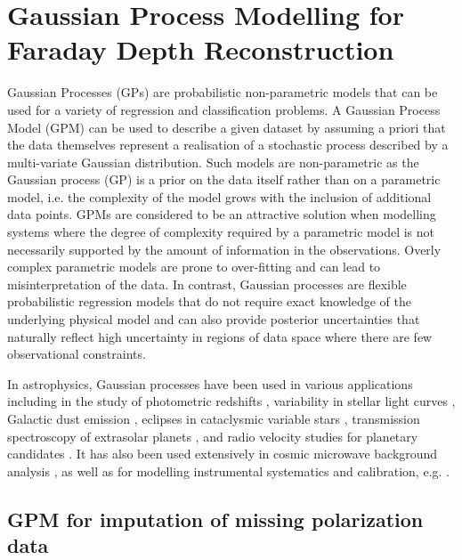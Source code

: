\documentclass[fleqn,usenatbib]{mnras}
\begin{document}
\section{Gaussian Process Modelling for Faraday Depth Reconstruction}
\label{sec:astrogpm}

Gaussian Processes (GPs) are probabilistic non-parametric models that can be used for a variety of regression and classification problems. A Gaussian Process Model (GPM) can be used to describe a given dataset by assuming a priori that the data themselves represent a realisation of a stochastic process described by a multi-variate Gaussian distribution. Such models are non-parametric as the Gaussian process (GP) is a prior on the data itself rather than on a parametric model, i.e. the complexity of the model grows with the inclusion of additional data points. GPMs are considered to be an attractive solution when modelling systems where the degree of complexity required by a parametric model is not necessarily supported by the amount of information in the observations. Overly complex parametric models are prone to over-fitting and can lead to misinterpretation of the data. In contrast, Gaussian processes are flexible probabilistic regression models that do not require exact knowledge of the underlying physical model and can also provide posterior uncertainties that naturally reflect high uncertainty in regions of data space where there are few observational constraints.

In astrophysics, Gaussian processes have been used in various applications including in the study of photometric redshifts \citep{wa06300n}, variability in stellar light curves \citep{2018MNRAS.474.2094A}, Galactic dust emission \citep{ensslinfromert}, eclipses in cataclysmic variable stars \citep{10.1093/mnras/stw2417}, transmission spectroscopy of extrasolar planets \citep{2012MNRAS.419.2683G}, and radio velocity studies for planetary candidates \citep{10.1093/mnras/stv1428}. It has also been used extensively in cosmic microwave background analysis \citep{1987MNRAS.226..655B, 1999CoScE...1...21B, PhysRevD.67.023001}, as well as for modelling instrumental systematics and calibration, e.g. \cite{2012MNRAS.419.2683G, 2014MNRAS.443.2517H, 2015ApJ...800...46B, Czekala_2015, 2015MNRAS.451..680E, 10.1093/mnras/stv1428, 2015Natur.526..546V, 2016MNRAS.459.2408A, 2016MNRAS.456L...6R, 2017MNRAS.466.4250L}.

\subsection{GPM for imputation of missing polarization data}
\label{sec:imputation}
\end{document}
